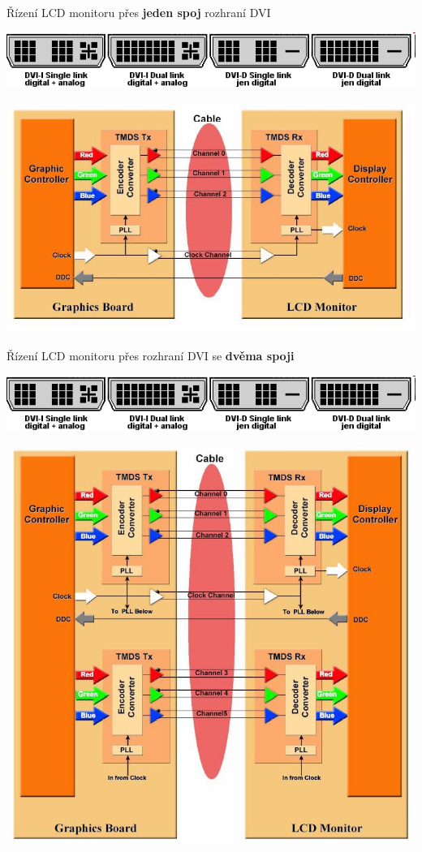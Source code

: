 \documentclass[aspectratio=43]{beamer}
\begin{document}
\begin{frame}{Řízení LCD monitoru přes \textbf{jeden spoj} rozhraní DVI}
	\begin{center}
		\includegraphics[width=0.8\linewidth]{extrahovane_obrazky/img_5_page6_1.png}
	\end{center}
	\begin{center}
		\includegraphics[width=1\linewidth]{extrahovane_obrazky/img_5_page6_0.jpeg}
	\end{center}
	
\end{frame}


\begin{frame}{Řízení LCD monitoru přes rozhraní DVI se \textbf{dvěma spoji}}
	\begin{center}
		\includegraphics[width=0.8\linewidth]{extrahovane_obrazky/img_5_page7_1.png}
	\end{center}
	\begin{center}
		\includegraphics[width=0.6\linewidth]{extrahovane_obrazky/img_5_page7_0.jpeg}
	\end{center}
	
	
\end{frame}
\end{document}
